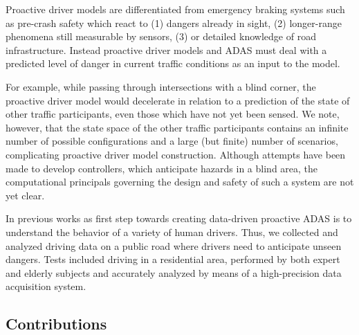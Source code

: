 \documentclass{easychair}
\begin{document}
Proactive driver models are differentiated from emergency braking systems such as pre-crash safety which react to (1) dangers already in sight, (2) longer-range phenomena still measurable by sensors, (3) or detailed knowledge of road infrastructure. Instead proactive driver models and ADAS must deal with a predicted level of danger in current traffic conditions as an input to the model. 

For example, while passing through intersections with a blind corner, the proactive driver model would decelerate in relation to a prediction of the state of other traffic participants, even those which have not yet been sensed. We note, however, that the state space of the other traffic participants contains an infinite number of possible configurations and a large (but finite) number of scenarios, complicating proactive driver model construction. Although attempts have been made to develop controllers, which anticipate hazards in a blind area, the computational principals governing the design and safety of such a system are not yet clear. 

In previous works as first step towards creating data-driven proactive ADAS is to understand the behavior of a variety of human drivers. Thus, we collected and analyzed driving data on a public road where drivers need to anticipate unseen dangers. Tests included driving in a residential area, performed by both expert and elderly subjects and accurately analyzed by means of a high-precision data acquisition system. 

\subsection{Contributions}
\end{document}
